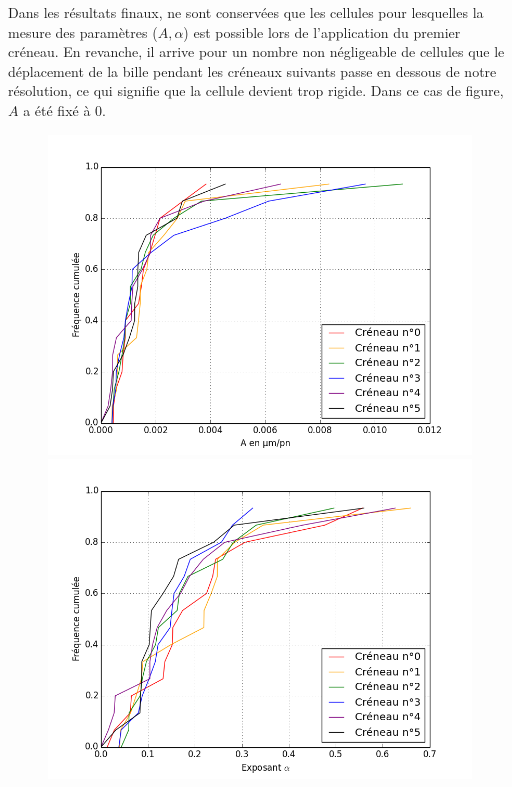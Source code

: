 Dans les résultats finaux, ne sont conservées que les cellules pour lesquelles la mesure des paramètres ($A, \alpha$) est possible lors de l'application du premier créneau. 
En revanche, il arrive pour un nombre non négligeable de cellules que le déplacement de la bille pendant les créneaux suivants passe en dessous de notre résolution, ce qui signifie que la cellule devient trop rigide. Dans ce cas de figure, $A$ a été fixé à 0. 

\begin{figure}
\includegraphics[scale=0.3]{Figures/A_creneaux_temoin.png}
\includegraphics[scale=0.3]{Figures/E_creneaux_temoin.png} 
\\

\end{figure}
